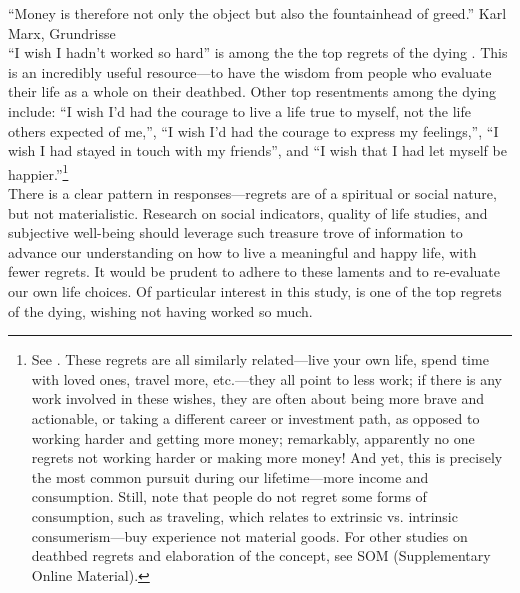 \documentclass[10pt, letterpaper]{article}
\begin{document}
\begin{spacing}{1.8} %

\noindent``Money is therefore not only the object but also the fountainhead of greed.'' Karl Marx, Grundrisse\\



\noindent ``I wish I hadn't worked so hard'' is among the the top regrets of the dying \citep{ware12}.
 This is an incredibly useful resource---to have the wisdom from people who evaluate their life as a whole on their deathbed. Other top resentments among the dying include: ``I wish I'd had the courage to live a life true to myself, not the life others
expected of me,'', ``I wish I'd had the courage to express my feelings,'', ``I wish I had stayed in touch with my friends'', and ``I wish that I had let myself be happier.''\footnote{See \citet{ware12}. These regrets are all similarly related---live your own life, spend time with loved ones, travel more, etc.---they all
  point to less work; if there is any work involved in these wishes, they are often about being
  more brave and actionable, or taking a different career or investment path, as opposed to
  working harder and getting more money; remarkably, apparently no one regrets not working harder or making more money! And yet, this is precisely the most common pursuit during our lifetime---more income and consumption. Still, note that people do not regret some forms of consumption, such as traveling, which relates to extrinsic vs. intrinsic consumerism---buy experience not material goods. For other studies on deathbed regrets and elaboration of the concept, see SOM (Supplementary Online Material).}\\

There is a clear pattern
in responses---regrets are of a spiritual or social nature, but not materialistic. Research on social indicators, quality of life studies, and subjective well-being should leverage such treasure
trove of information
to advance our understanding on how to live a meaningful and happy life, with fewer regrets. 
It  would be prudent to adhere to these laments and to re-evaluate our own life choices. Of particular interest in this study, is one of the top regrets of the dying, wishing not having worked so much.  


\end{spacing}
\end{document}
